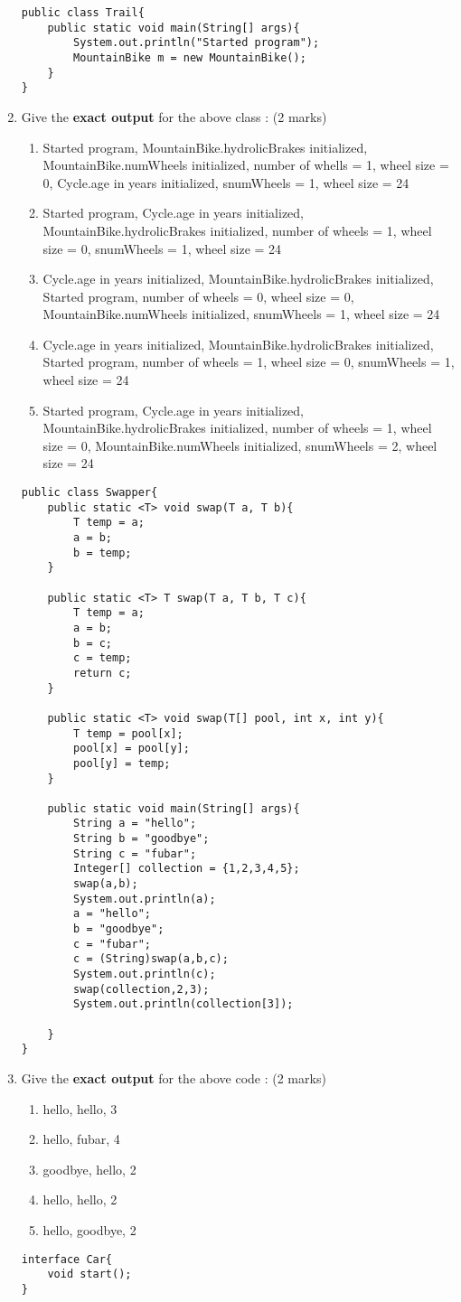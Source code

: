 \documentclass{article}
\begin{document}
\begin{enumerate}[resume]
\begin{lstlisting}
public class Trail{
	public static void main(String[] args){
		System.out.println("Started program");
		MountainBike m = new MountainBike();
	}
}
\end{lstlisting}
	\item Give the \textbf{exact output} for the above class : (2 marks)
	\begin{enumerate}
		\item Started program, MountainBike.hydrolicBrakes initialized, MountainBike.numWheels initialized, number of whells = 1, wheel size = 0, Cycle.age in years initialized, snumWheels = 1, wheel size = 24
		\item Started program, Cycle.age in years initialized, MountainBike.hydrolicBrakes initialized, number of wheels = 1, wheel size = 0, snumWheels = 1, wheel size = 24
		\item Cycle.age in years initialized, MountainBike.hydrolicBrakes initialized, Started program, number of wheels = 0, wheel size = 0, MountainBike.numWheels initialized, snumWheels = 1, wheel size = 24
		\item Cycle.age in years initialized, MountainBike.hydrolicBrakes initialized, Started program, number of wheels = 1, wheel size = 0, snumWheels = 1, wheel size = 24
		\item Started program, Cycle.age in years initialized, MountainBike.hydrolicBrakes initialized, number of wheels = 1, wheel size = 0, MountainBike.numWheels initialized, snumWheels = 2, wheel size = 24
	\end{enumerate}
	\newpage
	\begin{lstlisting}
public class Swapper{
	public static <T> void swap(T a, T b){
		T temp = a;
		a = b;
		b = temp;
	}
	
	public static <T> T swap(T a, T b, T c){
		T temp = a;
		a = b;
		b = c;
		c = temp;
		return c;
	}
	
	public static <T> void swap(T[] pool, int x, int y){
		T temp = pool[x];
		pool[x] = pool[y];
		pool[y] = temp;
	}
	
	public static void main(String[] args){
		String a = "hello";
		String b = "goodbye";
		String c = "fubar";
		Integer[] collection = {1,2,3,4,5};
		swap(a,b);
		System.out.println(a);
		a = "hello";
		b = "goodbye";
		c = "fubar";
		c = (String)swap(a,b,c);
		System.out.println(c);
		swap(collection,2,3);
		System.out.println(collection[3]);
		
	}
}
	\end{lstlisting}
	\item Give the \textbf{exact output} for the above code : (2 marks)
	\begin{enumerate}
		\item hello, hello, 3
		\item hello, fubar, 4
		\item goodbye, hello, 2
		\item hello, hello, 2
		\item hello, goodbye, 2
	\end{enumerate}
	\newpage
	\begin{lstlisting}
interface Car{
	void start();
}


\end{lstlisting}
\end{enumerate}
\end{document}
